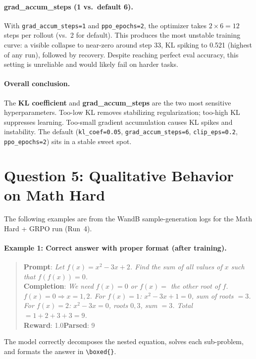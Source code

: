 \documentclass[11pt]{article}
\newcommand{\boxedcmd}{\texttt{\textbackslash boxed\{\}}}
\begin{document}
\paragraph{grad\_accum\_steps (1 vs.\ default 6).}
With \texttt{grad\_accum\_steps=1} and \texttt{ppo\_epochs=2}, the optimizer takes
$2\times 6 = 12$ steps per rollout (vs.\ 2 for default).
This produces the most unstable training curve: a visible collapse to near-zero around
step 33, KL spiking to 0.521 (highest of any run), followed by recovery.
Despite reaching perfect eval accuracy, this setting is unreliable and would likely fail
on harder tasks.

\paragraph{Overall conclusion.}
The \textbf{KL coefficient} and \textbf{grad\_accum\_steps} are the two most sensitive
hyperparameters.
Too-low KL removes stabilizing regularization; too-high KL suppresses learning.
Too-small gradient accumulation causes KL spikes and instability.
The default (\texttt{kl\_coef=0.05}, \texttt{grad\_accum\_steps=6},
\texttt{clip\_eps=0.2}, \texttt{ppo\_epochs=2}) sits in a stable sweet spot.

\section*{Question 5: Qualitative Behavior on Math Hard}
\label{sec:qualitative}

The following examples are from the WandB sample-generation logs for the
Math Hard + GRPO run (Run~4).

\paragraph{Example 1: Correct answer with proper format (after training).}
\begin{quote}
\textbf{Prompt}: \textit{Let $f(x) = x^2 - 3x + 2$. Find the sum of all values of $x$
such that $f(f(x)) = 0$.}\\[0.3em]
\textbf{Completion}: \textit{We need $f(x) = 0$ or $f(x) = $ the other root of $f$.
$f(x)=0 \Rightarrow x=1,2$.
For $f(x)=1$: $x^2-3x+1=0$, sum of roots $= 3$.
For $f(x)=2$: $x^2-3x=0$, roots $0,3$, sum $= 3$.
Total $= 1+2+3+3 = \boxed{9}$.}\\[0.3em]
\textbf{Reward}: 1.0\quad\textbf{Parsed}: 9
\end{quote}
The model correctly decomposes the nested equation, solves each sub-problem, and formats
the answer in \boxedcmd{}.
\end{document}
